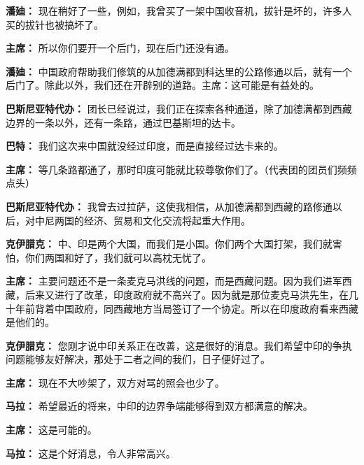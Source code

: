 \begin{list}{}
\item[\textbf{潘廸：}] 现在稍好了一些，例如，我曾买了一架中国收音机，拔针是坏的，许多人买的拔针也被搞坏了。

\item[\textbf{主席：}] 所以你们要开一个后门，现在后门还没有通。

\item[\textbf{潘廸：}] 中国政府帮助我们修筑的从加德满都到科达里的公路修通以后，就有一个后门了。除此以外，我们还在开辟别的道路。主席：这可能是有益处的。

\item[\textbf{巴斯尼亚特代办：}] 团长已经说过，我们正在探索各种通道，除了加德满都到西藏边界的一条以外，还有一条路，通过巴基斯坦的达卡。

\item[\textbf{巴特：}] 我们这次来中国就没经过印度，而是直接经过达卡来的。

\item[\textbf{主席：}] 等几条路都通了，那时印度可能就比较尊敬你们了。（代表团的团员们频频点头）

\item[\textbf{巴斯尼亚特代办：}] 我曾去过拉萨，这使我相信，从加德满都到西藏的路修通以后，对中尼两国的经济、贸易和文化交流将起重大作用。

\item[\textbf{克伊腊克：}] 中、印是两个大国，而我们是小国。你们两个大国打架，我们就害怕，你们两国和好了，我们就可以高枕无忧了。

\item[\textbf{主席：}] 主要问题还不是一条麦克马洪线的问题，而是西藏问题。因为我们进军西藏，后来又进行了改革，印度政府就不高兴了。因为就是那位麦克马洪先生，在几十年前背着中国政府，同西藏地方当局签订了一个协定。所以在印度政府看来西藏是他们的。

\item[\textbf{克伊腊克：}] 您刚才说中印关系正在改善，这是很好的消息。我们希望中印的争执问题能够友好解决，那处于二者之间的我们，日子便好过了。

\item[\textbf{主席：}] 现在不大吵架了，双方对骂的照会也少了。

\item[\textbf{马拉：}] 希望最近的将来，中印的边界争端能够得到双方都满意的解决。

\item[\textbf{主席：}] 这是可能的。

\item[\textbf{马拉：}] 这是个好消息，令人非常高兴。


\end{list}
